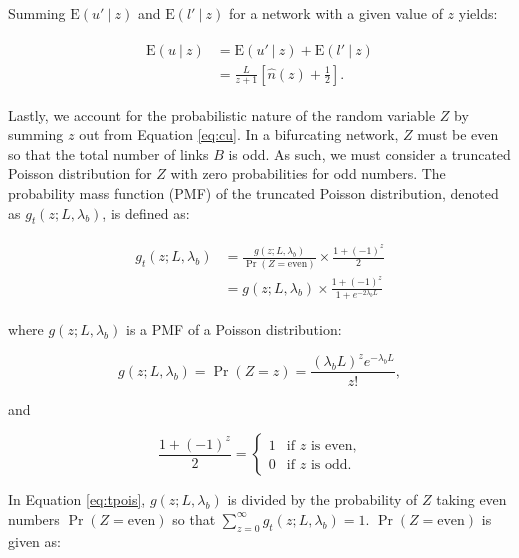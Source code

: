 \documentclass[11pt, class=article, crop=false]{standalone}
\begin{document}
Summing $\mbox{E}(u' ~|~ z)$ and $\mbox{E}(l'~|~z)$ for a network with a given value of $z$ yields:

\begin{align}
    \begin{split}
        \mbox{E}(u ~|~ z) &= \mbox{E}(u' ~|~ z) + \mbox{E}(l'~|~z)\\
                          &= \frac{L}{z+1} \left[ \hat{n}(z) + \frac{1}{2} \right].
    \end{split}
    \label{eq:cu}
\end{align}

Lastly, we account for the probabilistic nature of the random variable $Z$ by summing $z$ out from Equation \ref{eq:cu}.
In a bifurcating network, $Z$ must be even so that the total number of links $B$ is odd.
As such, we must consider a truncated Poisson distribution for $Z$ with zero probabilities for odd numbers.
The probability mass function (PMF) of the truncated Poisson distribution, denoted as $g_{t}(z; L, \lambda_b)$, is defined as:

\begin{align}
    \begin{split}
    g_{t}(z; L, \lambda_b) &= \frac{g(z; L, \lambda_b)}{\Pr(Z = \text{even})} \times \frac{1 + (-1)^{z}}{2}\\
                           &= g(z; L, \lambda_b) \times \frac{1 + (-1)^{z}}{1 + e^{-2\lambda_b L}}
    \end{split}
    \label{eq:tpois}
\end{align}

where $g(z; L, \lambda_b)$ is a PMF of a Poisson distribution:

\begin{equation}
    g(z; L, \lambda_b) = \Pr(Z = z) = \frac{(\lambda_b L)^{z} e^{-\lambda_b L}}{z!},
\end{equation}

and

\begin{equation}
    \frac{1 + (-1)^{z}}{2} =
    \begin{cases}
        1 & \text{if $z$ is even,}\\
        0 & \text{if $z$ is odd.}
    \end{cases}
\end{equation}

In Equation \ref{eq:tpois}, $g(z; L, \lambda_b)$ is divided by the probability of $Z$ taking even numbers $\Pr(Z = \text{even})$ so that $\sum_{z=0}^{\infty} g_t(z; L, \lambda_b) = 1$.
$\Pr(Z = \text{even})$ is given as:
\end{document}
